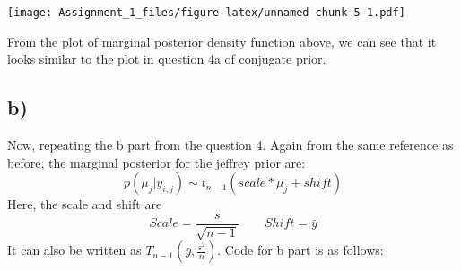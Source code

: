 \documentclass[]{article}
\begin{document}
\texttt{[image: Assignment\_1\_files/figure-latex/unnamed-chunk-5-1.pdf]}

From the plot of marginal posterior density function above, we can see
that it looks similar to the plot in question 4a of conjugate prior.

\subsection{b)}\label{b-2}

Now, repeating the b part from the question 4. Again from the same
reference as before, the marginal posterior for the jeffrey prior are:
\[p(\mu_j|y_{i,j}) \sim t_{n-1}(scale* \mu_j + shift)\] Here, the scale
and shift are \[Scale = \frac{s}{\sqrt{n-1}} \qquad Shift = \bar{y}\] It
can also be written as \(T_{n-1} (\bar{y}, \frac{s^2}{n})\). Code for b
part is as follows:
\end{document}
